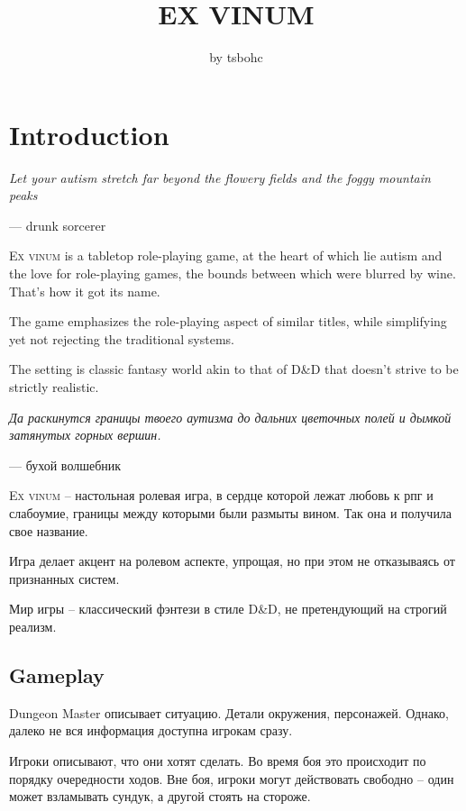 \documentclass[a5paper,11pt]{book}
\title{\textbf{EX VINUM}}
\author{by tsbohc}
\date{}
\begin{document}
\maketitle
\thispagestyle{empty}
\enlargethispage{\baselineskip}
\tableofcontents
\pagebreak

\chapter{Introduction}
\begin{multicols}{2}

\begin{en}
\epigraph{\emph{Let your autism stretch far beyond the flowery fields and the foggy mountain peaks}}{--- drunk sorcerer}

\lettrine{E}{x vinum} is a tabletop role-playing game, at the heart of which lie autism and the love for role-playing games, the bounds between which were blurred by wine. That's how it got its name.

The game emphasizes the role-playing aspect of similar titles, while simplifying yet not rejecting the traditional systems.

The setting is classic fantasy world akin to that of D\&D that doesn't strive to be strictly realistic.
\end{en}

\begin{ru}
\epigraph{\emph{Да раскинутся границы твоего аутизма до дальних цветочных полей и дымкой затянутых горных вершин.}}{--- бухой волшебник}

\lettrine{E}{x vinum} -- настольная ролевая игра, в сердце которой лежат любовь к рпг и слабоумие, границы между которыми были размыты вином. Так она и получила свое название.

Игра делает акцент на ролевом аспекте, упрощая, но при этом не отказываясь от признанных систем.

Мир игры -- классический фэнтези в стиле D\&D, не претендующий на строгий реализм.
\end{ru}

\section{Gameplay}
\begin{ru}
Dungeon Master описывает ситуацию. Детали окружения, персонажей. Однако, далеко не вся информация доступна игрокам сразу.

Игроки описывают, что они хотят сделать. Во время боя это происходит по порядку очередности ходов. Вне боя, игроки могут действовать свободно -- один может взламывать сундук, а другой стоять на стороже.


\end{ru}
\end{multicols}
\end{document}
